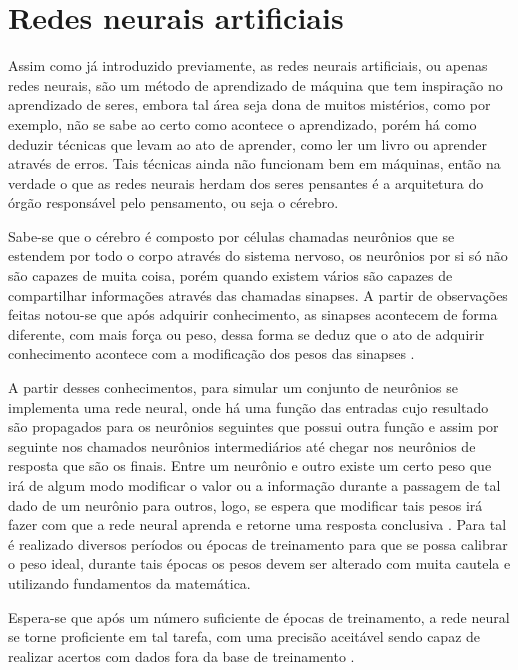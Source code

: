 \section{Redes neurais artificiais}

Assim como já introduzido previamente, as redes neurais artificiais, ou apenas redes neurais, são um método de aprendizado de máquina que tem inspiração no aprendizado de seres, embora tal área seja dona de muitos mistérios, como por exemplo, não se sabe ao certo como acontece o aprendizado, porém há como deduzir técnicas que levam ao ato de aprender, como ler um livro ou aprender através de erros. Tais técnicas ainda não funcionam bem em máquinas, então na verdade o que as redes neurais herdam dos seres pensantes é a arquitetura do órgão responsável pelo pensamento, ou seja o cérebro.

Sabe-se que o cérebro é composto por células chamadas neurônios que se estendem por todo o corpo através do sistema nervoso, os neurônios por si só não são capazes de muita coisa, porém quando existem vários são capazes de compartilhar informações através das chamadas sinapses. 
A partir de observações feitas notou-se que após adquirir conhecimento, as sinapses acontecem de forma diferente, com mais força ou peso, dessa forma se deduz que o ato de adquirir conhecimento acontece com a modificação dos pesos das sinapses \cite{Haykin1998}.

A partir desses conhecimentos, para simular um conjunto de neurônios se implementa uma rede neural, onde há uma função das entradas cujo resultado são propagados para os neurônios seguintes que possui outra função e assim por seguinte nos chamados neurônios intermediários até chegar nos neurônios de resposta que são os finais.
Entre um neurônio e outro existe um certo peso que irá de algum modo modificar o valor ou a informação durante a passagem de tal dado de um neurônio para outros, logo, se espera que modificar tais pesos irá fazer com que a rede neural aprenda e retorne uma resposta conclusiva \cite{lecun2015deep}. Para tal é realizado diversos períodos ou épocas de treinamento para que se possa calibrar o peso ideal, durante tais épocas os pesos devem ser alterado com muita cautela e utilizando fundamentos da matemática.

Espera-se que após um número suficiente de épocas de treinamento, a rede neural se torne proficiente em tal tarefa, com uma precisão aceitável sendo capaz de realizar acertos com dados fora da base de treinamento \cite{Aggarwal2018}.

